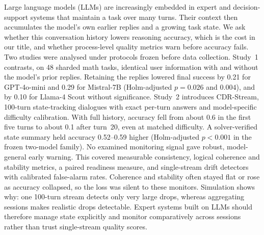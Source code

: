 Large language models (LLMs) are increasingly embedded in expert and
decision-support systems that maintain a task over many turns. Their context
then accumulates the model's own earlier replies and a growing task state. We
ask whether this conversation history lowers reasoning accuracy, which is the
cost in our title, and whether process-level quality metrics warn before
accuracy fails. Two studies were analysed under protocols frozen before data
collection. Study~1 contrasts, on 48 sharded math tasks, identical user
information with and without the model's prior replies. Retaining the replies
lowered final success by 0.21 for GPT-4o-mini and 0.29 for Mistral-7B
(Holm-adjusted $p=0.026$ and $0.004$), and by 0.10 for Llama-4 Scout without
significance. Study~2 introduces CDR-Stream, 100-turn state-tracking dialogues
with exact per-turn answers and model-specific difficulty calibration.
With full history, accuracy fell from about 0.6 in the first five turns to about
0.1 after turn~20, even at matched difficulty. A solver-verified state summary
held accuracy 0.52--0.59 higher (Holm-adjusted $p<0.001$ in the frozen
two-model family). No examined monitoring signal gave robust, model-general
early warning. This covered measurable consistency, logical coherence and
stability metrics, a paired readiness measure, and single-stream drift detectors
with calibrated false-alarm rates. Coherence and stability often stayed flat or
rose as accuracy collapsed, so the loss was silent to these monitors. Simulation
shows why: one 100-turn stream detects only very large drops, whereas
aggregating sessions makes realistic drops detectable. Expert systems built on
LLMs should therefore manage state explicitly and monitor comparatively across
sessions rather than trust single-stream quality scores.
